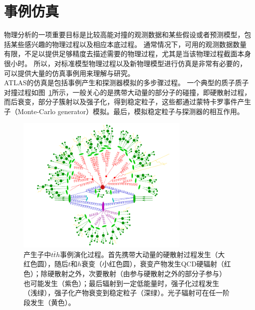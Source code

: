 \section{事例仿真}\label{sec:evt_simulation}
物理分析的一项重要目标是比较高能对撞的观测数据和某些假设或者预测模型，包括某些感兴趣的物理过程以及相应本底过程。
通常情况下，可用的观测数据数量有限，不足以提供足够精度去描述需要的物理过程，尤其是当该物理过程截面本身很小时。
所以，对标准模型物理过程以及新物理模型进行仿真是非常有必要的，可以提供大量的仿真事例用来理解与研究。\\
ATLAS的仿真是包括事例产生和探测器模拟的多步骤过程。
一个典型的质子质子对撞过程如图~\ref{fig:evt_egen_chain}所示，一般关心的是携带大动量的部分子的碰撞，即硬散射过程，而后衰变，部分子簇射以及强子化，得到稳定粒子，这些都通过蒙特卡罗事件产生子（Monte-Carlo generator）模拟\cite{BUCKLEY2011145}。最后，模拟稳定粒子与探测器的相互作用。
\begin{figure}
\centering
\includegraphics[width=0.75\textwidth]{fig/evt_egen_chain.png}
\caption{产生子中$t\bar{t}h$事例演化过程\cite{Gleisberg:2008ta}。首先携带大动量的硬散射过程发生（大红色圆），随后$t$和$h$衰变（小红色圆），衰变产物发生QCD硬辐射（红色）；除硬散射之外，次要散射（由参与硬散射之外的部分子参与）也可能发生（紫色）；最后辐射到一定低能量时，强子化过程发生（浅绿），强子化产物衰变到稳定粒子（深绿）。光子辐射可在任一阶段发生（黄色）。}
\label{fig:evt_egen_chain}
\end{figure}
